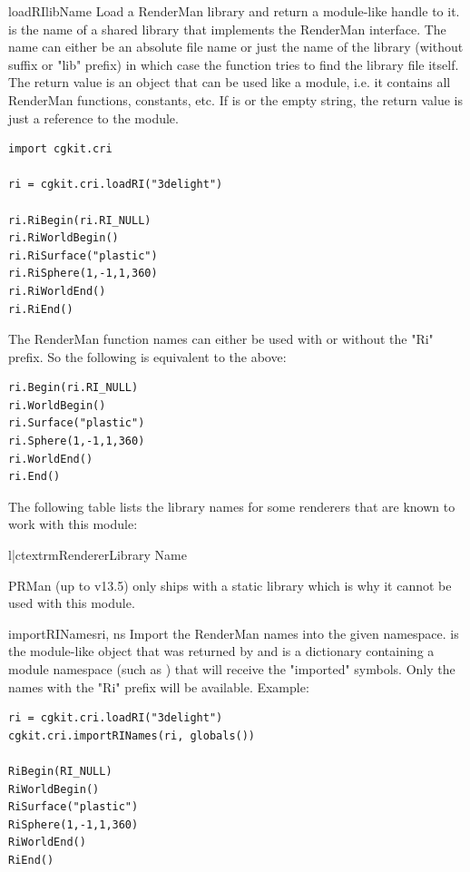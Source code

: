 \begin{funcdesc}{loadRI}{libName}
Load a RenderMan library and return a module-like handle to it.    
 is the name of a shared library that implements the RenderMan
interface. The name can either be an absolute file name or just the
name of the library (without suffix or "lib" prefix) in which case the
function tries to find the library file itself. The return value is
an object that can be used like a module, i.e. it contains all RenderMan
functions, constants, etc.
If  is  or the empty string, the return value is
just a reference to the  module.

\begin{verbatim}
import cgkit.cri

ri = cgkit.cri.loadRI("3delight")

ri.RiBegin(ri.RI_NULL)
ri.RiWorldBegin()
ri.RiSurface("plastic")
ri.RiSphere(1,-1,1,360)
ri.RiWorldEnd()
ri.RiEnd()
\end{verbatim}

The RenderMan function names can either be used with or without the
"Ri" prefix. So the following is equivalent to the above:

\begin{verbatim}
ri.Begin(ri.RI_NULL)
ri.WorldBegin()
ri.Surface("plastic")
ri.Sphere(1,-1,1,360)
ri.WorldEnd()
ri.End()
\end{verbatim}

The following table lists the library names for some renderers that are known to
work with this module:

\begin{tableii}{l|c}{textrm}{Renderer}{Library Name}
\end{tableii}

PRMan (up to v13.5) only ships with a static library which is why it cannot be
used with this module.

\end{funcdesc}

\begin{funcdesc}{importRINames}{ri, ns}
Import the RenderMan names into the given namespace.
 is the module-like object that was returned by 
and  is a dictionary containing a module namespace (such as 
) that will receive the "imported" symbols. Only
the names with the "Ri" prefix will be available. Example:

\begin{verbatim}
ri = cgkit.cri.loadRI("3delight")
cgkit.cri.importRINames(ri, globals())

RiBegin(RI_NULL)
RiWorldBegin()
RiSurface("plastic")
RiSphere(1,-1,1,360)
RiWorldEnd()
RiEnd()
\end{verbatim}
\end{funcdesc}

